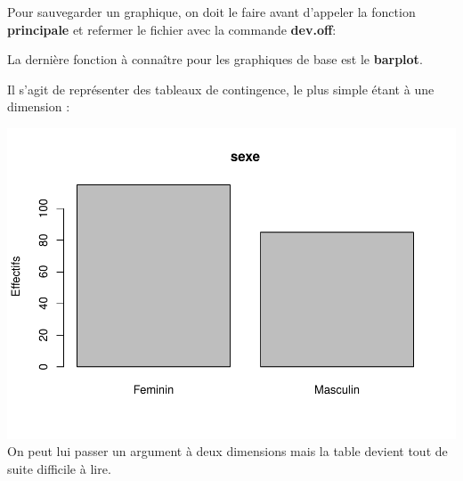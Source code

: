 \documentclass[
]{book}
\newenvironment{Shaded}{\begin{snugshade}}{\end{snugshade}}
\newcommand{\AttributeTok}[1]{\textcolor[rgb]{0.13,0.29,0.53}{#1}}
\newcommand{\FunctionTok}[1]{\textcolor[rgb]{0.13,0.29,0.53}{\textbf{#1}}}
\newcommand{\NormalTok}[1]{#1}
\newcommand{\OtherTok}[1]{\textcolor[rgb]{0.56,0.35,0.01}{#1}}
\newcommand{\SpecialCharTok}[1]{\textcolor[rgb]{0.81,0.36,0.00}{\textbf{#1}}}
\newcommand{\StringTok}[1]{\textcolor[rgb]{0.31,0.60,0.02}{#1}}
\begin{document}
Pour sauvegarder un graphique, on doit le faire avant d'appeler la fonction
\textbf{principale} et refermer le fichier avec la commande \textbf{dev.off}:

La dernière fonction à connaître pour les graphiques de base est le \textbf{barplot}.

Il s'agit de représenter des tableaux de contingence, le plus simple étant à une
dimension :

\begin{Shaded}
\end{Shaded}

\includegraphics{_main_files/figure-latex/sexe1-1.pdf}
On peut lui passer un argument à deux dimensions mais la table devient tout de
suite difficile à lire.

\begin{Shaded}
\end{Shaded}
\end{document}
